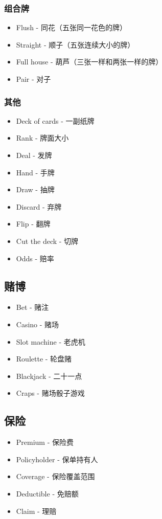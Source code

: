 \documentclass[9pt,landscape]{article}
\begin{document}
\begin{multicols}{3}
\subsubsection{组合牌}
\begin{itemize}
	\item Flush - 同花（五张同一花色的牌）
	\item Straight - 顺子（五张连续大小的牌）
	\item Full house - 葫芦（三张一样和两张一样的牌）
	\item Pair - 对子
\end{itemize}

\subsubsection{其他}

\begin{itemize}
	\item Deck of cards - 一副纸牌
	\item Rank - 牌面大小
	\item Deal - 发牌
	\item Hand - 手牌
	\item Draw - 抽牌
	\item Discard - 弃牌
	\item Flip - 翻牌
	\item Cut the deck - 切牌
	\item Odds - 赔率
\end{itemize}

\subsection{赌博}

\begin{itemize}
	\item Bet - 赌注
	\item Casino - 赌场
	\item Slot machine - 老虎机
	\item Roulette - 轮盘赌
	\item Blackjack - 二十一点
	\item Craps - 赌场骰子游戏
\end{itemize}

\subsection{保险}

\begin{itemize}
	\item Premium - 保险费
	\item Policyholder - 保单持有人
	\item Coverage - 保险覆盖范围
	\item Deductible - 免赔额
	\item Claim - 理赔
\end{itemize}


\end{multicols}
\end{document}
